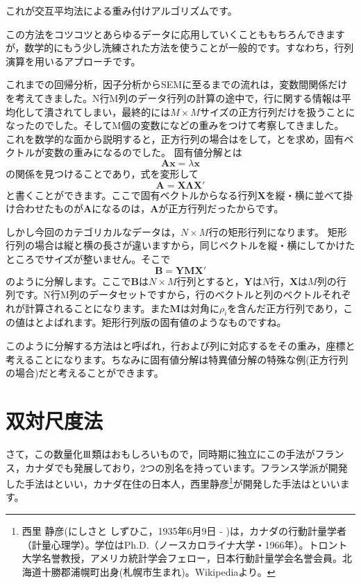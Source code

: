 \documentclass{ltjsbook}
\begin{document}
これが交互平均法による重み付けアルゴリズムです。

この方法をコツコツとあらゆるデータに応用していくことももちろんできますが，数学的にもう少し洗練された方法を使うことが一般的です。すなわち，行列演算を用いるアプローチです。

これまでの回帰分析，因子分析からSEMに至るまでの流れは，変数間関係だけを考えてきました。N行M列のデータ行列の計算の途中で，行に関する情報は平均化して潰されてしまい，最終的には$M \times M$サイズの正方行列だけを扱うことになったのでした。そしてM個の変数になどの重みをつけて考察してきました。
これを数学的な面から説明すると，正方行列の場合はをして，とを求め，固有ベクトルが変数の重みになるのでした。
固有値分解とは
\[ \bm{Ax} = \lambda\bm{x} \]
の関係を見つけることであり，式を変形して
\[ \bm{A} = \bm{X \Lambda X}' \]
と書くことができます。ここで固有ベクトルからなる行列$\bm{X}$を縦・横に並べて掛け合わせたものが$\bm{A}$になるのは，$\bm{A}$が正方行列だったからです。

しかし今回のカテゴリカルなデータは，$N\times M$行の矩形行列になります。
矩形行列の場合は縦と横の長さが違いますから，同じベクトルを縦・横にしてかけたところでサイズが整いません。そこで
\[ \bm{B} = \bm{Y M X}' \]
のように分解します。ここで$\bm{B}$は$N \times M$行列とすると，$\bm{Y}$は$N$行，$\bm{X}$は$M$列の行列です。N行M列のデータセットですから，行のベクトルと列のベクトルそれぞれが計算されることになります。また$\bm{M}$は対角に$\rho_i$を含んだ正方行列であり，この値はとよばれます。矩形行列版の固有値のようなものですね。

このように分解する方法はと呼ばれ，行および列に対応するをその重み，座標と考えることになります。ちなみに固有値分解は特異値分解の特殊な例(正方行列の場合)だと考えることができます。

\section{双対尺度法}
さて，この数量化$\mathrm{I}\hspace{-1.2pt}\mathrm{I}\hspace{-1.2pt}\mathrm{I}$類はおもしろいもので，同時期に独立にこの手法がフランス，カナダでも発展しており，2つの別名を持っています。フランス学派が開発した手法はといい，カナダ在住の日本人，西里静彦\footnote{西里 静彦(にしさと しずひこ，1935年6月9日 - )は，カナダの行動計量学者（計量心理学）。学位はPh.D.（ノースカロライナ大学・1966年）。トロント大学名誉教授，アメリカ統計学会フェロー，日本行動計量学会名誉会員。北海道十勝郡浦幌町出身(札幌市生まれ)。Wikipediaより。}が開発した手法はといいます。
\end{document}
